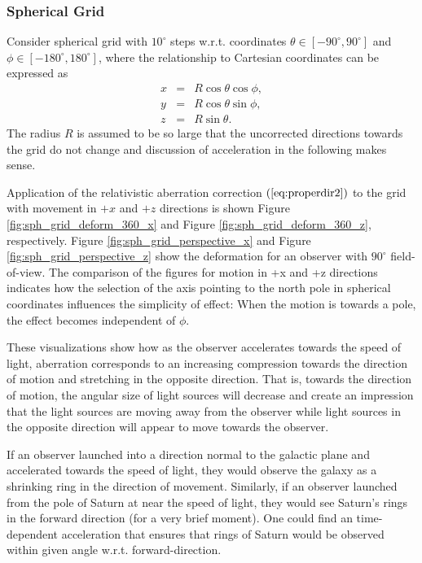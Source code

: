 \documentclass [12pt, a4paper] {article}
\begin{document}
\subsubsection{Spherical Grid}
Consider spherical grid with $10^\circ$ steps w.r.t. coordinates
$\theta\in[-90^\circ, 90^\circ]$ and $\phi\in[-180^\circ, 180^\circ]$, 
where the relationship to Cartesian coordinates can be expressed as
\begin {eqnarray}
    x &=& R\cos\theta\cos\phi, \\
    y &=& R\cos\theta\sin\phi, \\
    z &=& R\sin\theta.
\end {eqnarray}
The radius $R$ is assumed to be so large that the uncorrected directions 
towards the grid do not change and discussion of acceleration in the following 
makes sense.

Application of the relativistic aberration correction $(\ref{eq:properdir2})$ 
to the grid with movement in $+x$ and $+z$ directions is shown Figure 
\ref{fig:sph_grid_deform_360_x}
and Figure 
\ref{fig:sph_grid_deform_360_z}, respectively.
Figure \ref{fig:sph_grid_perspective_x} and Figure \ref{fig:sph_grid_perspective_z} 
show the deformation for an observer with $90^\circ$ field-of-view. 
The comparison of the figures for motion in +x and +z directions indicates how the 
selection of the axis pointing to the north pole in spherical coordinates influences 
the simplicity of effect: When the motion is towards a pole, the effect becomes 
independent of $\phi$.

These visualizations show how as the observer accelerates towards the speed of light,
aberration corresponds to an increasing compression towards the direction of motion 
and stretching in the opposite direction. That is, towards the direction 
of motion, the angular size of light sources will decrease and create an impression
that the light sources are moving away from the observer while light sources 
in the opposite direction will appear to move towards the observer. 

If an observer launched into a direction normal to the galactic plane and 
accelerated towards the speed of light, they would observe the galaxy as a 
shrinking ring in the direction of movement. Similarly, if an observer launched 
from the pole of Saturn at near the speed of light, they would see Saturn's rings 
in the forward direction (for a very brief moment). One could find an 
time-dependent acceleration that ensures that rings of Saturn would be observed 
within given angle w.r.t. forward-direction.
\end{document}
